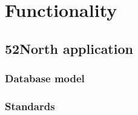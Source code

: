 \chapter{Functionality}

\section{52North application}

\subsection{Database model}

\subsection{Standards}

